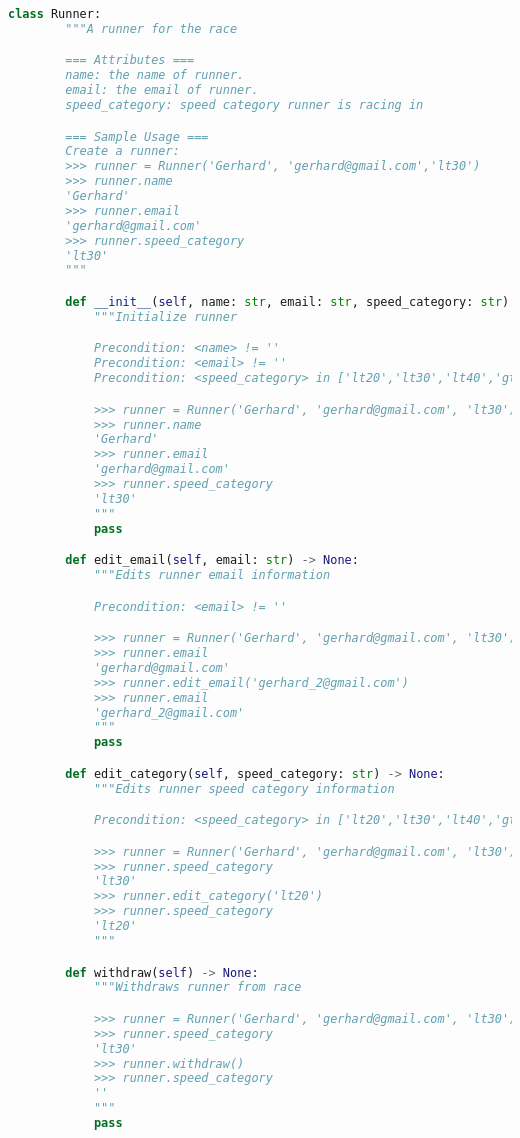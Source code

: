 \documentclass[12pt]{article}
\begin{document}
\begin{enumerate}[1.]
\begin{lstlisting}[language=Python]
    class Runner:
        """A runner for the race

        === Attributes ===
        name: the name of runner.
        email: the email of runner.
        speed_category: speed category runner is racing in

        === Sample Usage ===
        Create a runner:
        >>> runner = Runner('Gerhard', 'gerhard@gmail.com','lt30')
        >>> runner.name
        'Gerhard'
        >>> runner.email
        'gerhard@gmail.com'
        >>> runner.speed_category
        'lt30'
        """

        def __init__(self, name: str, email: str, speed_category: str) -> None:
            """Initialize runner

            Precondition: <name> != ''
            Precondition: <email> != ''
            Precondition: <speed_category> in ['lt20','lt30','lt40','gt40','']

            >>> runner = Runner('Gerhard', 'gerhard@gmail.com', 'lt30')
            >>> runner.name
            'Gerhard'
            >>> runner.email
            'gerhard@gmail.com'
            >>> runner.speed_category
            'lt30'
            """
            pass

        def edit_email(self, email: str) -> None:
            """Edits runner email information

            Precondition: <email> != ''

            >>> runner = Runner('Gerhard', 'gerhard@gmail.com', 'lt30')
            >>> runner.email
            'gerhard@gmail.com'
            >>> runner.edit_email('gerhard_2@gmail.com')
            >>> runner.email
            'gerhard_2@gmail.com'
            """
            pass

        def edit_category(self, speed_category: str) -> None:
            """Edits runner speed category information

            Precondition: <speed_category> in ['lt20','lt30','lt40','gt40']

            >>> runner = Runner('Gerhard', 'gerhard@gmail.com', 'lt30')
            >>> runner.speed_category
            'lt30'
            >>> runner.edit_category('lt20')
            >>> runner.speed_category
            'lt20'
            """

        def withdraw(self) -> None:
            """Withdraws runner from race

            >>> runner = Runner('Gerhard', 'gerhard@gmail.com', 'lt30')
            >>> runner.speed_category
            'lt30'
            >>> runner.withdraw()
            >>> runner.speed_category
            ''
            """
            pass


\end{lstlisting}
\end{enumerate}
\end{document}
